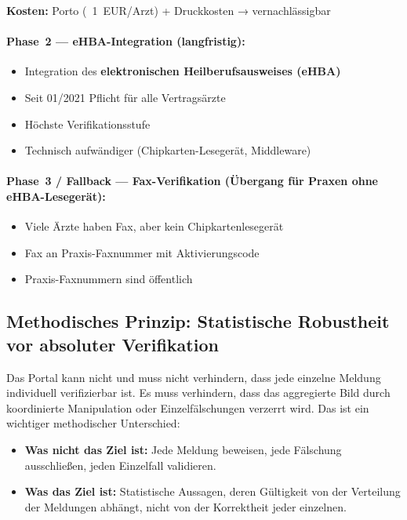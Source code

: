 \documentclass{umbruch-position}
\begin{document}
\textbf{Kosten:} Porto (~1 \,EUR/Arzt) + Druckkosten → vernachl\"assigbar

\paragraph{Phase~2 --- eHBA-Integration (langfristig):}
\begin{itemize}[nosep]
  \item Integration des \textbf{elektronischen Heilberufsausweises (eHBA)}
  \item Seit 01/2021 Pflicht f\"ur alle Vertrags\"arzte
  \item H\"ochste Verifikationsstufe
  \item Technisch aufw\"andiger (Chipkarten-Leseger\"at, Middleware)
\end{itemize}

\paragraph{Phase~3 / Fallback --- Fax-Verifikation (\"Ubergang f\"ur Praxen ohne eHBA-Leseger\"at):}
\begin{itemize}[nosep]
  \item Viele \"Arzte haben Fax, aber kein Chipkartenleseger\"at
  \item Fax an Praxis-Faxnummer mit Aktivierungscode
  \item Praxis-Faxnummern sind \"offentlich
\end{itemize}

\subsection{Methodisches Prinzip: Statistische Robustheit vor absoluter Verifikation}

Das Portal kann nicht und muss nicht verhindern, dass jede einzelne Meldung individuell verifizierbar ist. Es muss verhindern, dass das aggregierte Bild durch koordinierte Manipulation oder Einzelfälschungen verzerrt wird. Das ist ein wichtiger methodischer Unterschied:

\begin{itemize}[nosep]
  \item \textbf{Was nicht das Ziel ist:} Jede Meldung beweisen, jede Fälschung ausschließen, jeden Einzelfall validieren.
  \item \textbf{Was das Ziel ist:} Statistische Aussagen, deren Gültigkeit von der Verteilung der Meldungen abhängt, nicht von der Korrektheit jeder einzelnen.
\end{itemize}
\end{document}
